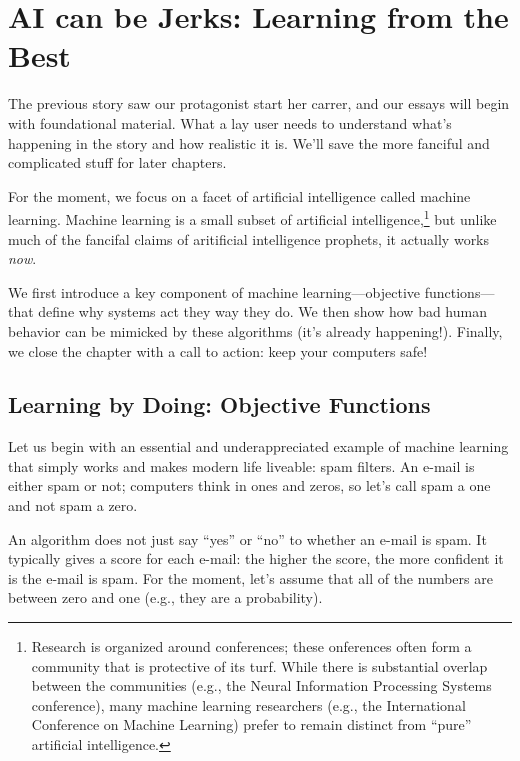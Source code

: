 
\newcommand{\salesjerk}[0]{Levi}

\chapter{AI can be Jerks: Learning from the Best}

The previous story saw our protagonist start her carrer, and our
essays will begin with foundational material.  What a lay user needs
to understand what's happening in the story and how realistic it is.
We'll save the more fanciful and complicated stuff for later chapters.

For the moment, we focus on a facet of artificial intelligence called
machine learning.  Machine learning is a small subset of artificial
intelligence,\footnote{Research is organized around conferences; these
  onferences often form a community that is protective of its turf.
  While there is substantial overlap between the communities (e.g.,
  the Neural Information Processing Systems conference), many machine
  learning researchers (e.g., the International Conference on Machine
  Learning) prefer to remain distinct from ``pure'' artificial
  intelligence.} but unlike much of the fancifal claims of aritificial
intelligence prophets, it actually works \emph{now}.

We first introduce a key component of machine learning---objective
functions---that define why systems act they way they do. We then show
how bad human behavior can be mimicked by these algorithms (it's
already happening!).  Finally, we close the chapter with a call to
action: keep your computers safe!

\section{Learning by Doing: Objective Functions}
\label{sec:objective-functions}

Let us begin with an essential and underappreciated example of machine
learning that simply works and makes modern life liveable: spam
filters.  An e-mail is either spam or not; computers think in ones and
zeros, so let's call spam a one and not spam a zero.

An algorithm does not just say ``yes'' or ``no'' to whether an e-mail
is spam.  It typically gives a score for each e-mail: the higher the
score, the more confident it is the e-mail is spam.  For the moment,
let's assume that all of the numbers are between zero and one (e.g.,
they are a probability).

